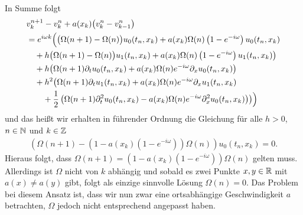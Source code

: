 In Summe folgt
\begin{align}\label{eq:wkb:difflsg}
\begin{split}
&v^{n+1}_k - v^n_k + a(x_k) \bigl( v^n_k - v^n_{k-1} \bigr)\\
&= e^{i \omega k} \Bigl(
\bigl(\Omega(n+1) - \Omega(n) \bigr) u_0(t_n, x_k) + a(x_k) \Omega(n) \left(1-e^{-i \omega}\right) u_0(t_n, x_k)\\
&\quad + h \bigl(\Omega(n+1) - \Omega(n) \bigr) u_1(t_n, x_k) + a(x_k) \Omega(n) \left(1-e^{-i \omega}\right) u_1(t_n, x_k) \bigr)\\
&\quad + h \bigl( \Omega(n+1) \partial_t u_0(t_n, x_k) + a(x_k) \Omega(n) e^{-i \omega} \partial_x u_0(t_n, x_k) \bigr)\\
&\quad + h^2 \bigl( \Omega(n+1) \partial_t u_1(t_n, x_k) + a(x_k) \Omega(n) e^{-i \omega} \partial_x u_1(t_n, x_k)\\
&\qquad + \frac{1}{2} \left( \Omega(n+1) \partial^2_t u_0(t_n, x_k) - a(x_k) \Omega(n) e^{-i \omega} \partial^2_x u_0(t_n, x_k) \right) \bigr) 
\Bigr)
\end{split}
\end{align}
und das heißt wir erhalten in führender Ordnung die Gleichung für alle $h > 0$, $n \in \mathbb N$ und $k \in \mathbb Z$
\begin{align}
\left( \Omega(n+1) - \left( 1 - a(x_k) \left(1-e^{-i \omega}\right) \right) \Omega(n) \right) u_0(t_n, x_k) = 0.
\end{align}
Hieraus folgt, dass 
$\Omega(n+1) = \left( 1 - a(x_k) \left(1-e^{-i \omega}\right) \right) \Omega(n)$
gelten muss.
Allerdings ist $\Omega$ nicht von $k$ abhängig und sobald es zwei Punkte $x,y \in \mathbb R$ mit $a(x) \neq a(y)$ gibt, folgt als einzige sinnvolle Lösung $\Omega(n) = 0$.
Das Problem bei diesem Ansatz ist, dass wir nun zwar eine ortsabhängige Geschwindigkeit $a$ betrachten, $\Omega$ jedoch nicht entsprechend angepasst haben.

